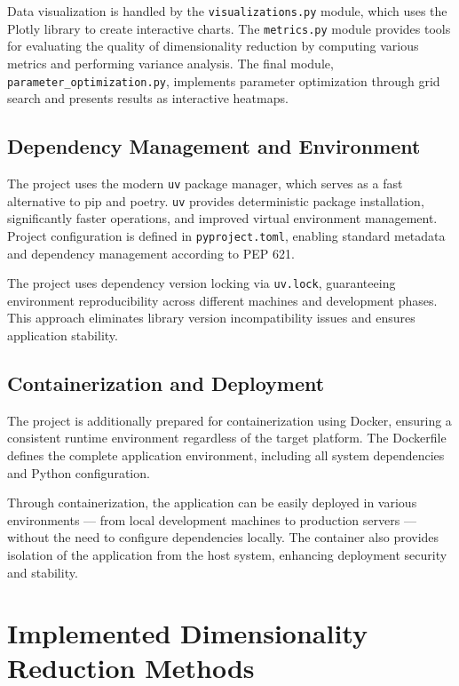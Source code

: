 \documentclass[a4paper, 12pt]{article}
\begin{document}
Data visualization is handled by the \texttt{visualizations.py} module, which uses the Plotly library to create interactive charts. The \texttt{metrics.py} module provides tools for evaluating the quality of dimensionality reduction by computing various metrics and performing variance analysis. The final module, \texttt{parameter\_optimization.py}, implements parameter optimization through grid search and presents results as interactive heatmaps.

\subsection{Dependency Management and Environment}

The project uses the modern \texttt{uv} package manager, which serves as a fast alternative to pip and poetry. \texttt{uv} provides deterministic package installation, significantly faster operations, and improved virtual environment management. Project configuration is defined in \texttt{pyproject.toml}, enabling standard metadata and dependency management according to PEP 621.

The project uses dependency version locking via \texttt{uv.lock}, guaranteeing environment reproducibility across different machines and development phases. This approach eliminates library version incompatibility issues and ensures application stability.

\subsection{Containerization and Deployment}

The project is additionally prepared for containerization using Docker, ensuring a consistent runtime environment regardless of the target platform. The Dockerfile defines the complete application environment, including all system dependencies and Python configuration.

Through containerization, the application can be easily deployed in various environments --- from local development machines to production servers --- without the need to configure dependencies locally. The container also provides isolation of the application from the host system, enhancing deployment security and stability.

\section{Implemented Dimensionality Reduction Methods}
\end{document}

